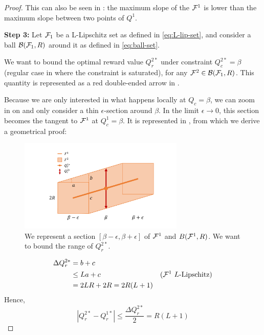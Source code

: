 \begin{proof}
This can also be seen in : the maximum slope of the $\mathcal{F}^1$ is lower than the maximum slope between two points of $Q^1$.

\textbf{Step 3:} Let $\mathcal{F}_1$ be a L-Lipschitz set as defined in \eqref{eq:L-lip-set}, and consider a ball $\mathcal{B}(\mathcal{F}_1,R)$ around it as defined in \eqref{eq:ball-set}.

We want to bound the optimal reward value $Q_r^{2*}$ under constraint $Q_c^{2*} = \beta$ (regular case in  where the constraint is saturated), for any $\mathcal{F}^2\in\mathcal{B}(\mathcal{F}_1,R)$. This quantity is represented as a red double-ended arrow in .

Because we are only interested in what happens locally at $Q_c=\beta$, we can zoom in on  and only consider a thin $\epsilon$-section around $\beta$. In the limit $\epsilon\rightarrow 0$, this section becomes the tangent to $\mathcal{F}^1$ at $Q_c^1=\beta$. It is represented in , from which we derive a geometrical proof:
\begin{figure}[ht]
    \centering
    \includegraphics[trim=2cm 1cm 2cm 1cm, clip, width=0.7\textwidth]{source/img/contraction_lipschitz_slope.pdf}
    \caption{We represent a section $[\beta-\epsilon, \beta+\epsilon]$ of $\mathcal{F}^1$ and $B(\mathcal{F}^1, R)$. We want to bound the range of $Q_r^{2*}.$}
    \label{fig:contraction_lips_hull_slope}
\end{figure}

\begin{align*}
    \Delta Q_r^{2*} &= b + c &\\
    & \leq La + c & \text{($\mathcal{F}^1$ $L$-Lipschitz)}\\
    &= 2LR+2R = 2R(L+1)
\end{align*}
Hence,
\begin{equation*}
    | Q_r^{2*} - Q_r^{1*}| \leq \frac{\Delta Q_r^{2*}}{2} = R(L+1)
\end{equation*}


\end{proof}
